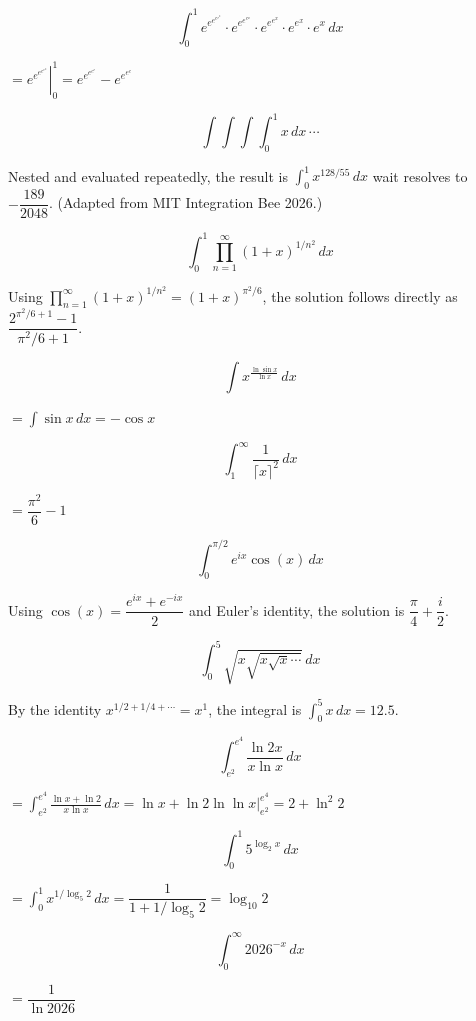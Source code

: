 \begin{questions}
\question \[ \int_0^1 e^{e^{e^{e^{e^{x}}}}}\cdot e^{e^{e^{e^{x}}}}\cdot e^{e^{e^{x}}}\cdot e^{e^{x}}\cdot e^{x}\, dx \]
\begin{solution}
$= \left.e^{e^{e^{e^{e^x}}}}\right|_0^1 = e^{e^{e^{e^{e}}}} - e^{e^{e^{e}}}$
\end{solution}

\question \[ \int\int\int\int_0^1 x\, dx\, \cdots \]
\begin{solution}
Nested and evaluated repeatedly, the result is $\displaystyle\int_0^1 x^{128/55}\, dx$ wait resolves to $-\dfrac{189}{2048}$. (Adapted from MIT Integration Bee 2026.)
\end{solution}

\question \[ \int_0^1 \prod_{n=1}^\infty (1+x)^{1/n^2}\, dx \]
\begin{solution}
Using $\displaystyle\prod_{n=1}^\infty (1+x)^{1/n^2} = (1+x)^{\pi^2/6}$, the solution follows directly as $\dfrac{2^{\pi^2/6+1}-1}{\pi^2/6+1}$.
\end{solution}

\question \[ \int x^{\frac{\ln\sin x}{\ln x}}\, dx \]
\begin{solution}
$= \displaystyle\int \sin x\, dx = -\cos x$
\end{solution}

\question \[ \int_1^\infty \frac{1}{\lceil x\rceil^2}\, dx \]
\begin{solution}
$= \dfrac{\pi^2}{6}-1$
\end{solution}

\question \[ \int_0^{\pi/2} e^{ix}\cos(x)\, dx \]
\begin{solution}
Using $\cos(x)=\dfrac{e^{ix}+e^{-ix}}{2}$ and Euler's identity, the solution is $\dfrac{\pi}{4}+\dfrac{i}{2}$.
\end{solution}

\question \[ \int_0^5 \sqrt{x\sqrt{x\sqrt{x}\cdots}}\, dx \]
\begin{solution}
By the identity $x^{1/2+1/4+\cdots}=x^1$, the integral is $\displaystyle\int_0^5 x\, dx = 12.5$.
\end{solution}

\question \[ \int_{e^2}^{e^4} \frac{\ln 2x}{x\ln x}\, dx \]
\begin{solution}
$= \displaystyle\int_{e^2}^{e^4} \frac{\ln x+\ln 2}{x\ln x}\, dx = \left.\ln x+\ln 2\ln\ln x\right|_{e^2}^{e^4} = 2+\ln^2 2$
\end{solution}

\question \[ \int_0^1 5^{\log_2 x}\, dx \]
\begin{solution}
$= \displaystyle\int_0^1 x^{1/\log_5 2}\, dx = \dfrac{1}{1+1/\log_5 2} = \log_{10} 2$
\end{solution}

\question \[ \int_0^\infty 2026^{-x}\, dx \]
\begin{solution}
$= \dfrac{1}{\ln 2026}$
\end{solution}

\end{questions}

